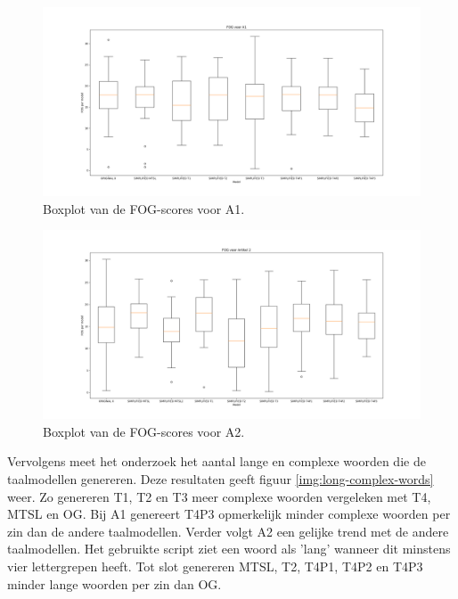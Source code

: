 \begin{figure}[H]
	\includegraphics[width=\linewidth]{img/boxplot-fog-a1.png}
	\caption{Boxplot van de FOG-scores voor A1.}
	\label{img:boxplot-fog-a1}
\end{figure}

\begin{figure}[H]
	\includegraphics[width=\linewidth]{img/boxplot-fog-a2.png}
	\caption{Boxplot van de FOG-scores voor A2.}
	\label{img:boxplot-fog-a2}
\end{figure}

Vervolgens meet het onderzoek het aantal lange en complexe woorden die de taalmodellen genereren. Deze resultaten geeft figuur \ref{img:long-complex-words} weer. Zo genereren T1, T2 en T3 meer complexe woorden vergeleken met T4, MTSL en OG. Bij A1 genereert T4P3 opmerkelijk minder complexe woorden per zin dan de andere taalmodellen. Verder volgt A2 een gelijke trend met de andere taalmodellen. Het gebruikte script ziet een woord als 'lang' wanneer dit minstens vier lettergrepen heeft. Tot slot genereren MTSL, T2, T4P1, T4P2 en T4P3 minder lange woorden per zin dan OG.

